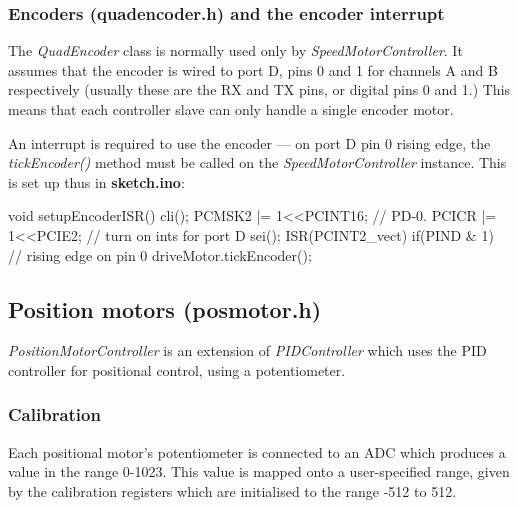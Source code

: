 \subsubsection{Encoders (quadencoder.h) and the encoder interrupt}
The \emph{QuadEncoder} class is normally used only by \emph{SpeedMotorController}. It assumes that the encoder is wired
to port D, pins 0 and 1 for channels A and B respectively (usually these are the RX and TX pins, or digital pins 0 and 1.)
This means that each controller slave can only handle a single encoder motor.

An interrupt is required to use the encoder --- on port D pin 0 rising edge, the \emph{tickEncoder()} method
must be called on the \emph{SpeedMotorController} instance. This is set up thus in \textbf{sketch.ino}:
\begin{v}
void setupEncoderISR(){
    cli();
    PCMSK2 |= 1<<PCINT16; // PD-0.
    PCICR |= 1<<PCIE2; // turn on ints for port D
    sei();
}
ISR(PCINT2_vect){
    if(PIND & 1) // rising edge on pin 0
        driveMotor.tickEncoder();
}
\end{v}

\subsection{Position motors (posmotor.h) }
\emph{PositionMotorController} is an extension of \emph{PIDController} which uses the PID controller
for positional control, using a potentiometer.

\subsubsection{Calibration}
Each positional motor's potentiometer is connected to an ADC which produces a value in the range 0-1023. This value
is mapped onto a user-specified range, given by the calibration registers which are initialised to the range
-512 to 512.

